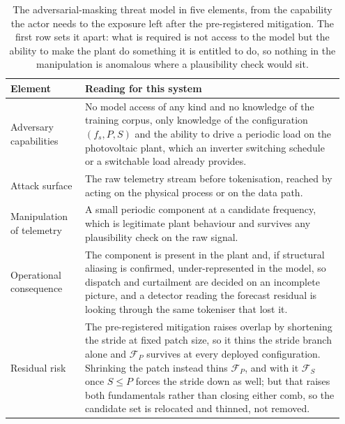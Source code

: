 \begin{table}[!t]
    \centering
\small
    \setlength{\tabcolsep}{5pt}
    \begin{tabular}{@{}M{0.215\linewidth} M{0.735\linewidth}@{}}
        \toprule
        \textbf{Element} & \textbf{Reading for this system} \\
        \midrule
        Adversary capabilities & No model access of any kind and no knowledge of the training corpus, only knowledge of the configuration $(f_s,P,S)$ and the ability to drive a periodic load on the photovoltaic plant, which an inverter switching schedule or a switchable load already provides. \\
        \rowsep%
        Attack surface & The raw telemetry stream before tokenisation, reached by acting on the physical process or on the data path. \\
        \rowsep%
        Manipulation of telemetry & A small periodic component at a candidate frequency, which is legitimate plant behaviour and survives any plausibility check on the raw signal. \\
        \midrule
        Operational consequence & The component is present in the plant and, if structural aliasing is confirmed, under-represented in the model, so dispatch and curtailment are decided on an incomplete picture, and a detector reading the forecast residual is looking through the same tokeniser that lost it. \\
        \rowsep%
        Residual risk & The pre-registered mitigation raises overlap by shortening the stride at fixed patch size, so it thins the stride branch alone and $\mathcal{F}_{P}$ survives at every deployed configuration. Shrinking the patch instead thins $\mathcal{F}_{P}$, and with it $\mathcal{F}_{S}$ once $S \le P$ forces the stride down as well; but that raises both fundamentals rather than closing either comb, so the candidate set is relocated and thinned, not removed. \\
        \bottomrule
    \end{tabular}
\caption{The adversarial-masking threat model in five elements, from the capability the actor needs to the exposure left after the pre-registered mitigation. The first row sets it apart: what is required is not access to the model but the ability to make the plant do something it is entitled to do, so nothing in the manipulation is anomalous where a plausibility check would sit.}%
    \label{tab:threatModel}
\end{table}
